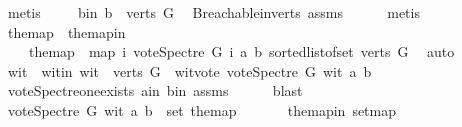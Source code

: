 \begin{isabellebody}
\ metis\ \isanewline
\ \ \isamarkupfalse%
\ b{\isacharunderscore}{\kern0pt}in{\isacharcolon}{\kern0pt}\ {\isachardoublequoteopen}b\ {\isasymin}\ verts\ G{\isachardoublequoteclose}\ \isamarkupfalse%
\ B{\isachardot}{\kern0pt}reachable{}{\isacharunderscore}{\kern0pt}in{\isacharunderscore}{\kern0pt}verts{\isacharparenleft}{\kern0pt}{}{\isacharparenright}{\kern0pt}\ assms{\isacharparenleft}{\kern0pt}{}{\isacharparenright}{\kern0pt}\isanewline
\ \ \ \ \isamarkupfalse%
\ metis\ \isanewline
\ \ \isamarkupfalse%
\ the{\isacharunderscore}{\kern0pt}map\ \ the{\isacharunderscore}{\kern0pt}map{\isacharunderscore}{\kern0pt}in{\isacharcolon}{\kern0pt}\ \isanewline
\ \ \ \ {\isachardoublequoteopen}the{\isacharunderscore}{\kern0pt}map\ {\isacharequal}{\kern0pt}\ {\isacharparenleft}{\kern0pt}map\ {\isacharparenleft}{\kern0pt}{\isasymlambda}i{\isachardot}{\kern0pt}\ vote{\isacharunderscore}{\kern0pt}Spectre\ G\ i\ a\ b{\isacharparenright}{\kern0pt}\ {\isacharparenleft}{\kern0pt}sorted{\isacharunderscore}{\kern0pt}list{\isacharunderscore}{\kern0pt}of{\isacharunderscore}{\kern0pt}set\ {\isacharparenleft}{\kern0pt}verts\ G{\isacharparenright}{\kern0pt}{\isacharparenright}{\kern0pt}{\isacharparenright}{\kern0pt}{\isachardoublequoteclose}\ \isamarkupfalse%
\ auto\isanewline
\ \ \isamarkupfalse%
\ wit\ \ wit{\isacharunderscore}{\kern0pt}in{\isacharcolon}{\kern0pt}\ {\isachardoublequoteopen}wit\ {\isasymin}\ verts\ G{\isachardoublequoteclose}\ \ wit{\isacharunderscore}{\kern0pt}vote{\isacharcolon}{\kern0pt}\ {\isachardoublequoteopen}vote{\isacharunderscore}{\kern0pt}Spectre\ G\ wit\ a\ b\ {\isasymnoteq}\ {}{\isachardoublequoteclose}\isanewline
\ \ \ \ \isamarkupfalse%
\ vote{\isacharunderscore}{\kern0pt}Spectre{\isacharunderscore}{\kern0pt}one{\isacharunderscore}{\kern0pt}exists\ a{\isacharunderscore}{\kern0pt}in\ b{\isacharunderscore}{\kern0pt}in\ assms{\isacharparenleft}{\kern0pt}{}{\isacharparenright}{\kern0pt}\isanewline
\ \ \ \ \isamarkupfalse%
\ blast\ \isanewline
\ \ \isamarkupfalse%
\ {\isachardoublequoteopen}{\isacharparenleft}{\kern0pt}vote{\isacharunderscore}{\kern0pt}Spectre\ G\ wit\ a\ b{\isacharparenright}{\kern0pt}\ {\isasymin}\ set\ the{\isacharunderscore}{\kern0pt}map{\isachardoublequoteclose}\ \isanewline
\ \ \ \ \isamarkupfalse%
\ the{\isacharunderscore}{\kern0pt}map{\isacharunderscore}{\kern0pt}in\ set{\isacharunderscore}{\kern0pt}map\ \isanewline

\end{isabellebody}
